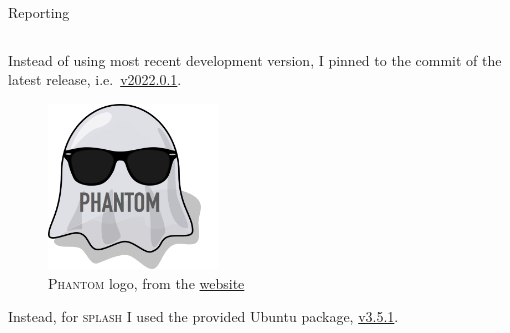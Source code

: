 \documentclass[9pt]{beamer}
\renewcommand{\phantom}{\textsc{Phantom}\xspace}
\newcommand{\splash}{\textsc{splash}\xspace}
\begin{document}
\begin{frame}{Reporting}
\begin{columns}
\begin{column}{0.5\textwidth}
            Instead of using most recent development version, I pinned to the
            commit of the latest release, i.e.\
            \href{https://github.com/danieljprice/phantom/releases/tag/v2022.0.1}{v2022.0.1}.
            \vspace*{5pt}

            \begin{figure}
                \includegraphics[width=0.4\textwidth]{phantom-sunglasses}
                \caption{
                    \phantom logo, from the
                    \href{https://phantomsph.bitbucket.io/}{website}
                }
            \end{figure}

            Instead, for \splash I used the provided Ubuntu package,
            \href{https://packages.ubuntu.com/kinetic/splash}{v3.5.1}.
        \end{column}
    \end{columns}
\end{frame}
\end{document}
